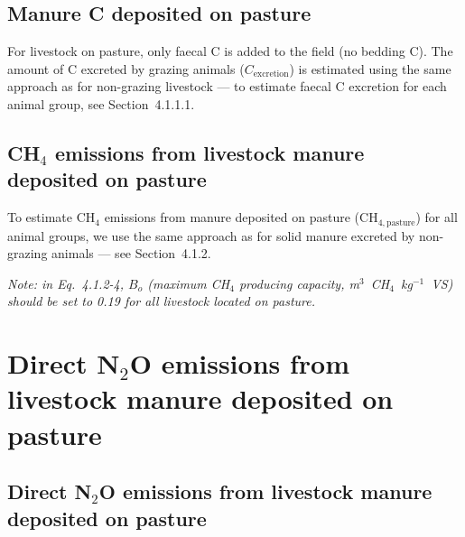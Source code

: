 \subsection{Manure C deposited on pasture}
\label{subsec:grazing-manure-c-deposited}

For livestock on pasture, only faecal C is added to the field (no bedding C).
The amount of C excreted by grazing animals ($C_{\mathrm{excretion}}$) is
estimated using the same approach as for non-grazing livestock --- to estimate
faecal C excretion for each animal group, see Section~4.1.1.1.

\subsection{CH\texorpdfstring{$_4$}{4} emissions from livestock manure deposited on pasture}
\label{subsec:grazing-ch4-manure}

To estimate CH$_4$ emissions from manure deposited on pasture
($\mathrm{CH}_{4,\mathrm{pasture}}$) for all animal groups, we use the same
approach as for solid manure excreted by non-grazing animals --- see
Section~4.1.2.

\noindent\textit{Note: in Eq.~4.1.2-4, $B_o$ (maximum CH$_4$ producing
capacity, m$^3$~CH$_4$~kg$^{-1}$~VS) should be set to 0.19 for all livestock
located on pasture.}

\section{Direct N\texorpdfstring{$_2$}{2}O emissions from livestock manure deposited on pasture}
\label{sec:grazing-direct-n2o}

\subsection{Direct N\texorpdfstring{$_2$}{2}O emissions from livestock manure deposited on pasture}
\label{subsec:grazing-direct-n2o-1}

